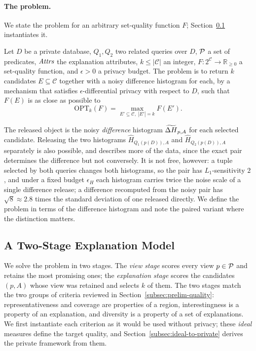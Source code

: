 \paragraph{The problem.}
We state the problem for an arbitrary set-quality function $F$; Section~\ref{sec:explanation-quality} instantiates it.

\begin{definition}
\label{def:problem}
Let $D$ be a private database, $Q_1,Q_2$ two related queries over $D$, $\mathcal{P}$ a set of predicates, $\mathit{Attrs}$ the explanation attributes, $k\le|\mathcal{C}|$ an integer, $F:2^{\mathcal{C}}\to\mathbb{R}_{\ge0}$ a set-quality function, and $\epsilon>0$ a privacy budget.
The problem is to return $k$ candidates $E\subseteq\mathcal{C}$ together with a noisy difference histogram for each, by a mechanism that satisfies $\epsilon$-differential privacy with respect to $D$, such that $F(E)$ is as close as possible to
\[
\mathrm{OPT}_k(F)=\max_{E'\subseteq\mathcal{C},\;|E'|=k}F(E').
\]
\end{definition}

\label{subsec:problem-definition}
The released object is the noisy \emph{difference} histogram $\widetilde{\Delta H}_{p,A}$ for each selected candidate.
Releasing the two histograms $\hat H_{Q_1(p(D)),A}$ and $\hat H_{Q_2(p(D)),A}$ separately is also possible, and describes more of the data, since the exact pair determines the difference but not conversely.
It is not free, however: a tuple selected by both queries changes both histograms, so the pair has $L_1$-sensitivity $2$, and under a fixed budget $\epsilon_H$ each histogram carries twice the noise scale of a single difference release; a difference recomputed from the noisy pair has $\sqrt8\approx2.8$ times the standard deviation of one released directly.
We define the problem in terms of the difference histogram and note the paired variant where the distinction matters.

\subsection{A Two-Stage Explanation Model}
\label{sec:explanation-quality}

We solve the problem in two stages.
The \emph{view stage} scores every view $p\in\mathcal{P}$ and retains the most promising ones; the \emph{explanation stage} scores the candidates $(p,A)$ whose view was retained and selects $k$ of them.
The two stages match the two groups of criteria reviewed in Section~\ref{subsec:prelim-quality}: representativeness and coverage are properties of a region, interestingness is a property of an explanation, and diversity is a property of a set of explanations.
We first instantiate each criterion as it would be used without privacy; these \emph{ideal} measures define the target quality, and Section~\ref{subsec:ideal-to-private} derives the private framework from them.

